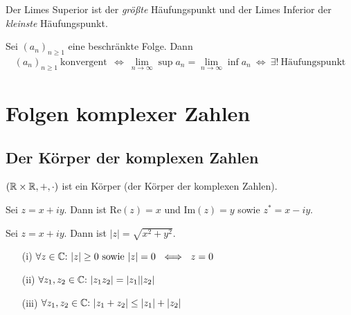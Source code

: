 \begin{framedthm}
	Der Limes Superior ist der \textit{größte} Häufungspunkt und der Limes Inferior der \textit{kleinste} Häufungspunkt.
\end{framedthm}


\begin{framedthm}
	Sei $(a_n)_{n\geq 1}$ eine beschränkte Folge. Dann
	\begin{align*}
		(a_n)_{n\geq 1} \ \textrm{konvergent}\ \ \iff\  \lim_{n \to \infty} \sup a_n =\lim_{n \to \infty} \inf a_n \ \iff \ \exists! \ \textrm{Häufungspunkt}
	\end{align*}
\end{framedthm}

\section{Folgen komplexer Zahlen}

\subsection{Der Körper der komplexen Zahlen}

\begin{framedthm}
	$(\mathbb{R} \times \mathbb{R}, +, \cdot)$ ist ein Körper (der Körper der komplexen Zahlen).
\end{framedthm}

\begin{frameddefn}
	Sei $z = x + iy$. Dann ist $\textrm{Re}(z) = x$ und $\textrm{Im}(z) = y$ sowie $z^* = x - iy$.
\end{frameddefn}

\begin{frameddefn}
	Sei $z = x + iy$. Dann ist $|z| = \sqrt{x^2+y^2}$.
\end{frameddefn}

\begin{framedthm}
	\begin{enumerate}
		\item[(i)] $\forall z \in \mathbb{C}{:}\  |z| \geq 0 \textrm{ sowie } |z| = 0 \ \iff\ z = 0$
		\item[(ii)] $\forall z_1,z_2 \in \mathbb{C}{:}\  |z_1 z_2| = |z_1| |z_2|$
		\item[(iii)] $\forall z_1,z_2 \in \mathbb{C}{:}\  |z_1 + z_2| \leq |z_1| + |z_2|$
	\end{enumerate}
\end{framedthm}

